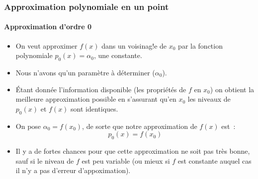 \documentclass[10pt,notheorems]{beamer}
\theoremstyle{plain}
\theoremstyle{definition} %
\begin{document}
\begin{frame}
  \frametitle{Approximation polynomiale en un point}
  \framesubtitle{Approximation d'ordre 0}
  \hypertarget{slide_taylor_3}{}

  \begin{itemize}

  \item On veut approximer $f(x)$ dans un voisinag!e de $x_0$ par la fonction polynomiale $p_0(x) = \alpha_0$, une constante.\newline

  \item Nous n'avons qu'un paramètre à déterminer ($\alpha_0$).\newline

  \item Étant donnée l'information disponible (les propriétés de $f$ en $x_0$) on obtient la meilleure approximation possible en s'assurant qu'en $x_0$ les niveaux de $p_0(x)$ et $f(x)$ sont identiques.\newline

  \item On pose $\alpha_0 = f(x_0)$, de sorte que notre approximation de $f(x)$ est~:
    \[
      p_0(x) = f(x_0)
    \]

  \item Il y a de fortes chances pour que cette approximation ne soit pas très bonne, sauf si le niveau de $f$ est peu variable (ou mieux si $f$ est constante auquel cas il n'y a pas d'erreur d'appoximation).

  \end{itemize}

\end{frame}
\end{document}
